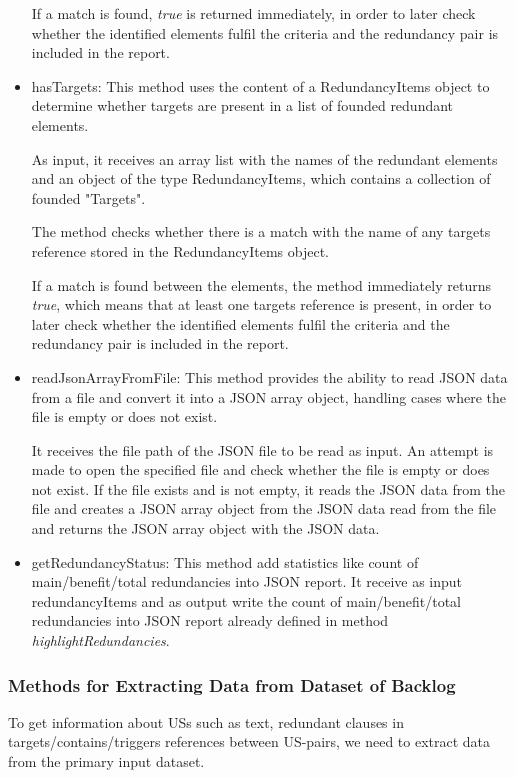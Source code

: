 \begin{itemize}
	If a match is found, \textit{true} is returned immediately, in order to later check whether the identified elements fulfil the criteria and the redundancy pair is included in the report.
	
	\item hasTargets: This method uses the content of a RedundancyItems object to determine whether targets are present in a list of founded redundant elements.
	
	As input, it receives an array list with the names of the redundant elements and an object of the type RedundancyItems, which contains a collection of founded "Targets".
	
	The method checks whether there is a match with the name of any targets reference stored in the RedundancyItems object. 
	
	If a match is found between the elements, the method immediately returns \textit{true}, which means that at least one targets reference is present, in order to later check whether the identified elements fulfil the criteria and the redundancy pair is included in the report.
	
	\item readJsonArrayFromFile: This method provides the ability to read JSON data from a file and convert it into a JSON array object, handling cases where the file is empty or does not exist.
	
	It receives the file path of the JSON file to be read as input. An attempt is made to open the specified file and check whether the file is empty or does not exist. If the file exists and is not empty, it reads the JSON data from the file and creates a JSON array object from the JSON data read from the file and returns the JSON array object with the JSON data.
	
	
	\item getRedundancyStatus: This method add statistics like count of main/benefit/total redundancies into JSON report. It receive as input redundancyItems and as output write the count of main/benefit/total redundancies into JSON report already defined in method \textit{highlightRedundancies}.
\end{itemize}
\subsubsection*{Methods for Extracting Data from Dataset of Backlog}
To get information about USs such as text, redundant clauses in targets/contains/triggers references between US-pairs, we need to extract data from the primary input dataset.

